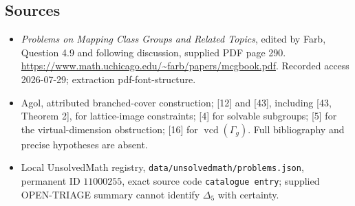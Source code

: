 \documentclass[11pt]{article}
\begin{document}
\subsection{Sources}
\begin{itemize}
\item \emph{Problems on Mapping Class Groups and Related Topics}, edited by Farb, Question 4.9 and following discussion, supplied PDF page 290. \url{https://www.math.uchicago.edu/~farb/papers/mcgbook.pdf}. Recorded access 2026-07-29; extraction pdf-font-structure.
\item Agol, attributed branched-cover construction; [12] and [43], including [43, Theorem 2], for lattice-image constraints; [4] for solvable subgroups; [5] for the virtual-dimension obstruction; [16] for \(\operatorname{vcd}(\Gamma_g)\). Full bibliography and precise hypotheses are absent.
\item Local UnsolvedMath registry, \texttt{data/unsolvedmath/problems.json}, permanent ID \(11000255\), exact source code \texttt{catalogue entry}; supplied OPEN-TRIAGE summary cannot identify \(\Delta_5\) with certainty.
\end{itemize}
\end{document}
